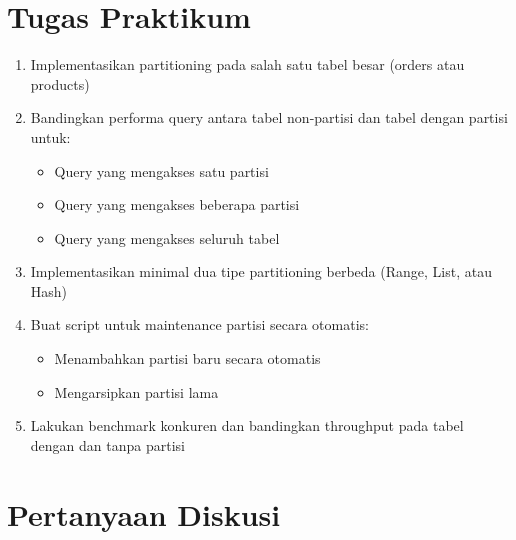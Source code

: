\section{Tugas Praktikum}

\begin{enumerate}
    \item Implementasikan partitioning pada salah satu tabel besar (orders atau products)
    
    \item Bandingkan performa query antara tabel non-partisi dan tabel dengan partisi untuk:
    \begin{itemize}
        \item Query yang mengakses satu partisi
        \item Query yang mengakses beberapa partisi
        \item Query yang mengakses seluruh tabel
    \end{itemize}
    
    \item Implementasikan minimal dua tipe partitioning berbeda (Range, List, atau Hash)
    
    \item Buat script untuk maintenance partisi secara otomatis:
    \begin{itemize}
        \item Menambahkan partisi baru secara otomatis
        \item Mengarsipkan partisi lama
    \end{itemize}
    
    \item Lakukan benchmark konkuren dan bandingkan throughput pada tabel dengan dan tanpa partisi
\end{enumerate}

\section{Pertanyaan Diskusi}

